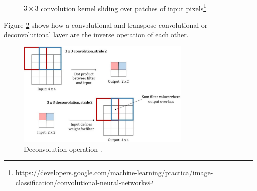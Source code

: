 \documentclass[report.tex]{subfiles}
\begin{document}
\begin{figure}[ht]
	\centering
        \begin{minipage}{1.\textwidth}
		\renewcommand\footnoterule{} %
		\renewcommand{\thempfootnote}{\fnsymbol{mpfootnote}}
		\centering
		\\
		\caption[$3 \times 3$ convolution kernel sliding over patches of input pixels]{$3 \times 3$ convolution kernel sliding over patches of input pixels\footnote[1]{\url{https://developers.google.com/machine-learning/practica/image-classification/convolutional-neural-networks}}}
		\label{fig:cnnbasic}
	\end{minipage}
\end{figure}

Figure \ref{fig:convtranspose} shows how a convolutional and transpose convolutional or deconvolutional layer are the inverse operation of each other.

\begin{figure}[ht]
	\centering
	\includegraphics[width=0.7500\textwidth]{./images-neural/convtranspose.png}
	\caption{Deconvolution operation \parencite[11]{convtranspose}.}
	\label{fig:convtranspose}
\end{figure}
\end{document}
